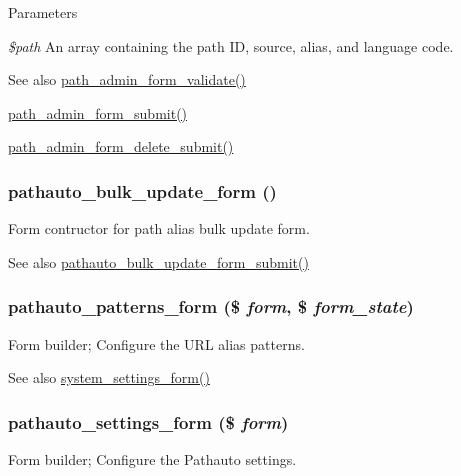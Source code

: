 \begin{DoxyParams}{Parameters}
\item[{\em \$path}]An array containing the path ID, source, alias, and language code.\end{DoxyParams}
\begin{DoxySeeAlso}{See also}
\hyperlink{path_8admin_8inc_a4251683f0b26edf9f54db68f4aa5e0b3}{path\_\-admin\_\-form\_\-validate()} 

\hyperlink{path_8admin_8inc_a9e4a6b6f202fad04dcdb2bbcd800d168}{path\_\-admin\_\-form\_\-submit()} 

\hyperlink{path_8admin_8inc_af54710cda76e928325030bf33414b8d3}{path\_\-admin\_\-form\_\-delete\_\-submit()} 
\end{DoxySeeAlso}
\hypertarget{group__forms_gadbfac53f8f52a25ad1d4b1a59bf8b907}{
\subsubsection[{pathauto\_\-bulk\_\-update\_\-form}]{\setlength{\rightskip}{0pt plus 5cm}pathauto\_\-bulk\_\-update\_\-form ()}}
\label{group__forms_gadbfac53f8f52a25ad1d4b1a59bf8b907}
Form contructor for path alias bulk update form.

\begin{DoxySeeAlso}{See also}
\hyperlink{pathauto_8admin_8inc_a34661ac29b8c6d623ed9437ad194cfa4}{pathauto\_\-bulk\_\-update\_\-form\_\-submit()} 
\end{DoxySeeAlso}
\hypertarget{group__forms_ga2b3adb295ed84c13148b9c34ce0b3b73}{
\subsubsection[{pathauto\_\-patterns\_\-form}]{\setlength{\rightskip}{0pt plus 5cm}pathauto\_\-patterns\_\-form (\$ {\em form}, \/  \$ {\em form\_\-state})}}
\label{group__forms_ga2b3adb295ed84c13148b9c34ce0b3b73}
Form builder; Configure the URL alias patterns.

\begin{DoxySeeAlso}{See also}
\hyperlink{group__forms_ga6fb270d34465d846cd4659a85d3e40c8}{system\_\-settings\_\-form()} 
\end{DoxySeeAlso}
\hypertarget{group__forms_ga59b24f3617ff78cc8c9d8b3b4990b6e2}{
\subsubsection[{pathauto\_\-settings\_\-form}]{\setlength{\rightskip}{0pt plus 5cm}pathauto\_\-settings\_\-form (\$ {\em form})}}
\label{group__forms_ga59b24f3617ff78cc8c9d8b3b4990b6e2}
Form builder; Configure the Pathauto settings.


